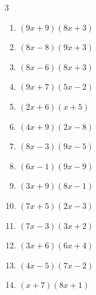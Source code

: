 \begin{multicols}{3}
\begin{enumerate}

  \item $(9x+9)(8x+3)$


\columnbreak %

\resetques

  \item $(8x-8)(9x+3)$


  \item $(8x-6)(8x+3)$


  \item $(9x+7)(5x-2)$


  \item $(2x+6)(x+5)$


  \item $(4x+9)(2x-8)$


  \item $(8x-3)(9x-5)$


  \item $(6x-1)(9x-9)$


  \item $(3x+9)(8x-1)$


  \item $(7x+5)(2x-3)$


  \item $(7x-3)(3x+2)$


  \item $(3x+6)(6x+4)$


  \item $(4x-5)(7x-2)$


  \item $(x+7)(8x+1)$


\end{enumerate}
\end{multicols}
